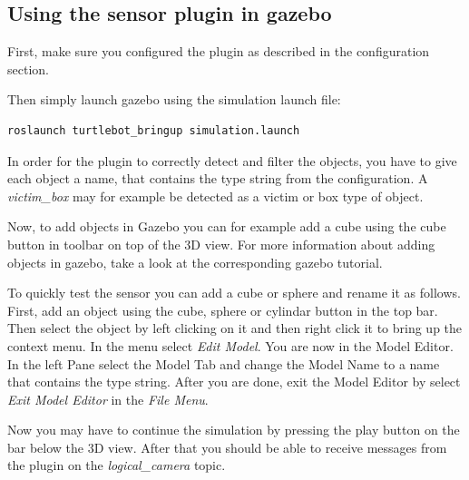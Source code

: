 \subsection{Using the sensor plugin in gazebo}

First, make sure you configured the plugin as described in the configuration section.

Then simply launch gazebo using the simulation launch file:

\begin{verbatim}
roslaunch turtlebot_bringup simulation.launch
\end{verbatim}

In order for the plugin to correctly detect and filter the objects, you have to give each object a name, that contains the type string from the configuration. A \textit{victim\_box} may for example be detected  as a victim or box type of object.

Now, to add objects in Gazebo you can for example add a cube using the cube button in toolbar on top of the 3D view. For more information about adding objects in gazebo, take a look at the corresponding gazebo tutorial.

To quickly test the sensor you can add a cube or sphere and rename it as follows.  First, add an object using the cube, sphere or cylindar button in the top bar. Then select the object by left clicking on it and then right click it to bring up the context menu. In the menu select \textit{Edit Model}. You are now in the Model Editor. In the left Pane select the Model Tab and change the Model Name to a name that contains the type string. After you are done, exit the Model Editor by select \textit{Exit Model Editor} in the \textit{File Menu}.

Now you may have to continue the simulation by pressing the play button on the bar below the 3D view. After that you should be able to receive messages from the plugin on the \textit{logical\_camera} topic.